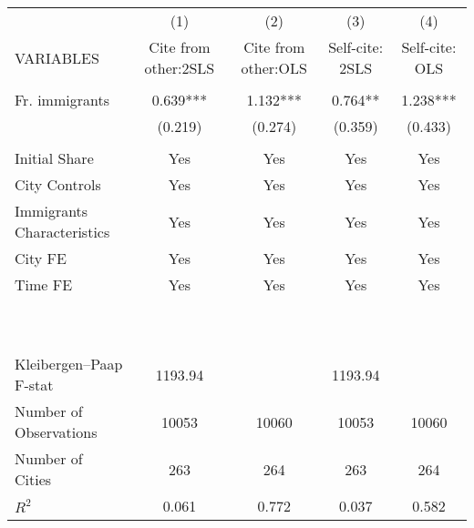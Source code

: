 \begin{tabular}{lcccc} \hline
 & (1) & (2) & (3) & (4) \\
VARIABLES & Cite from other:2SLS & Cite from other:OLS & Self-cite: 2SLS & Self-cite: OLS \\ \hline
 &  &  &  &  \\
Fr. immigrants & 0.639*** & 1.132*** & 0.764** & 1.238*** \\
 & (0.219) & (0.274) & (0.359) & (0.433) \\
 &  &  &  &  \\
Initial Share & Yes & Yes & Yes & Yes \\
City Controls & Yes & Yes & Yes & Yes \\
Immigrants Characteristics & Yes & Yes & Yes & Yes \\
City FE & Yes & Yes & Yes & Yes \\
Time FE & Yes & Yes & Yes & Yes \\
~ & ~ & ~ & ~ & ~ \\
~ & ~ & ~ & ~ & ~ \\
Kleibergen–Paap F-stat & 1193.94 &  & 1193.94 &  \\
Number of Observations & 10053 & 10060 & 10053 & 10060 \\
Number of Cities & 263 & 264 & 263 & 264 \\
 $ R^2$ & 0.061 & 0.772 & 0.037 & 0.582 \\ \hline
\end{tabular}
